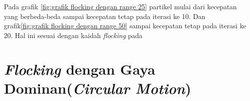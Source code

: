 \hspace{0.6cm} Pada grafik \ref{fig:grafik flocking dengan range 25} partikel mulai dari kecepatan yang berbeda-beda sampai kecepatan tetap pada iterasi ke 10. Dan grafik\ref{fig:grafik flocking dengan range 50} sampai kecepatan tetap pada iterasi ke 20. Hal ini sesuai dengan kaidah \textit{flocking} pada \citep{Bajec2007} 

\section{\textit{Flocking} dengan Gaya Dominan(\textit{Circular Motion})}%

